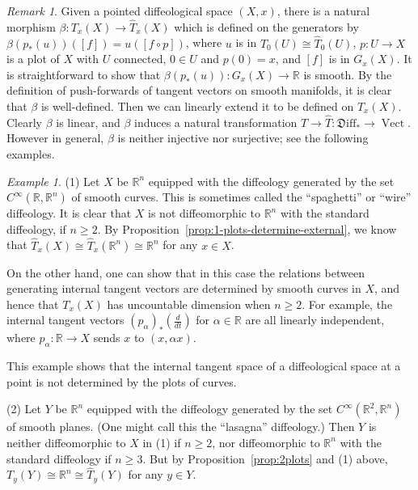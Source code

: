 \documentclass[12pt]{amsart}
\theoremstyle{remark}
\newtheorem{rem}[de]{Remark}
\newtheorem{ex}[de]{Example}
\newcommand{\ra}{\to}
\DeclareMathOperator{\Vect}{Vect}
\newcommand{\Diff}{{\mathfrak{D}\mathrm{iff}}}
\def \R{\mathbb{R}}
\begin{document}
%
%
%
%
%
%
%
%
%
%
%
%
%
%
%
%
%
%
%
%
%

\begin{rem}\label{rem:comparison-map}
Given a pointed diffeological space $(X,x)$,
there is a natural morphism $\beta:T_x(X) \ra \hat{T}_x(X)$
which is defined on the generators by
$\beta(p_*(u))([f])=u([f \circ p])$,
where $u$ is in $T_0(U) \cong \hat{T}_0(U)$,
$p:U \ra X$ is a plot of $X$ with $U$ connected,
$0 \in U$ and $p(0)=x$, and $[f]$ is in $G_x(X)$.
It is straightforward to show that $\beta(p_*(u)):G_x(X) \ra \R$ is smooth.
By the definition of push-forwards of tangent vectors on smooth manifolds,
it is clear that $\beta$ is well-defined.
Then we can linearly extend it to be defined on $T_x(X)$.
Clearly $\beta$ is linear,
and $\beta$ induces a natural transformation $T \ra \hat{T}:\Diff_* \ra \Vect$.
However in general, $\beta$ is neither injective nor surjective; see the following examples.
%
\end{rem}


\begin{ex}\label{ex:wirediffeology}
(1)
Let $X$ be $\R^n$ equipped with the diffeology generated by the set
$C^\infty(\R,\R^n)$ of smooth curves.
This is sometimes called the ``spaghetti'' or ``wire'' diffeology.
It is clear that $X$ is not diffeomorphic to $\R^n$ with the standard diffeology,
if $n \geq 2$.
By Proposition~\ref{prop:1-plots-determine-external}, we know that
$\hat{T}_x(X) \cong \hat{T}_x(\R^n) \cong \R^n$ for any $x \in X$.

On the other hand, one can show that in this case the relations between
generating internal tangent vectors are determined by smooth curves in $X$,
and hence that $T_x(X)$ has uncountable dimension when $n \geq 2$.
%
%
%
For example, the internal tangent vectors $(p_{\alpha})_*(\frac{d}{dt})$
for $\alpha \in \R$ are all linearly independent, where $p_{\alpha} : \R \to X$
sends $x$ to $(x, \alpha x)$.

This example shows that the internal tangent space of
a diffeological space at a point is not determined by the plots of curves.

%
(2) Let $Y$ be $\R^n$ equipped with the diffeology generated by the set
$C^\infty(\R^2,\R^n)$ of smooth planes.
(One might call this the ``lasagna'' diffeology.)
Then $Y$ is neither diffeomorphic to $X$ in (1) if $n \geq 2$,
nor diffeomorphic to $\R^n$ with the standard diffeology if $n \geq 3$.
But by Proposition~\ref{prop:2plots} and (1) above,
$T_y(Y) \cong \R^n \cong \hat{T}_y(Y)$ for any $y \in Y$.
%
%
%
%
\end{ex}
\end{document}
